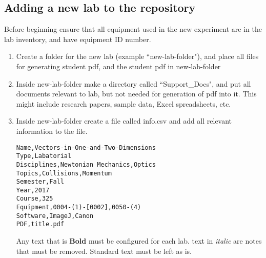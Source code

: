 \documentclass[justified]{book}
\begin{document}

\subsection{Adding a new lab to the repository}

Before beginning ensure that all equipment used in the new experiment are in the lab inventory, and have equipment ID number. 

\begin{enumerate}
\item Create a folder for the new lab (example ``new-lab-folder"), and place all files for generating student pdf, and the student pdf in new-lab-folder
\item Inside new-lab-folder make a directory called ``Support\_Docs", and put all documents relevant to lab, but not needed for generation of pdf into it. This might include research papers, sample data, Excel spreadsheets, etc.
\item Inside new-lab-folder create a file called info.csv and add all relevant information to the file.\\


\begin{lstlisting}[backgroundcolor = \color{light-gray},
					caption = The file info.csv needs to be in this form. See below for more details
                   %language = C,
                   xleftmargin = 2cm,
                   framexleftmargin = 1em
                   ]
Name,Vectors-in-One-and-Two-Dimensions
Type,Labatorial
Disciplines,Newtonian Mechanics,Optics
Topics,Collisions,Momentum
Semester,Fall
Year,2017
Course,325
Equipment,0004-(1)-[0002],0050-(4)
Software,ImageJ,Canon
PDF,title.pdf
\end{lstlisting}


Any text that is \textbf{Bold} must be configured for each lab. text in \textit{italic} are notes that must be removed. Standard text must be left as is.


\end{enumerate}
\end{document}
